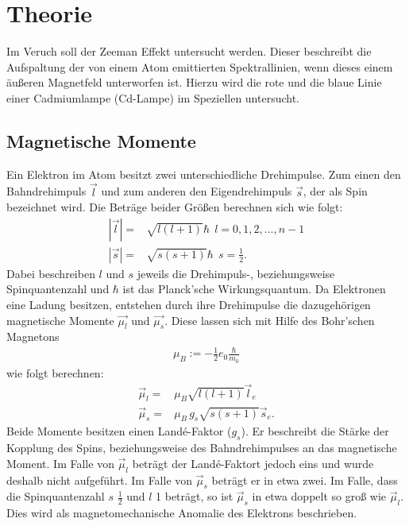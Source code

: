 \section{Theorie}
Im Veruch soll der Zeeman Effekt untersucht werden. Dieser beschreibt die Aufspaltung der
von einem Atom emittierten Spektrallinien, wenn dieses einem äußeren Magnetfeld unterworfen
ist. Hierzu wird die rote und die blaue Linie einer Cadmiumlampe (Cd-Lampe) im Speziellen
untersucht.
\subsection{Magnetische Momente}
Ein Elektron im Atom besitzt zwei unterschiedliche Drehimpulse. Zum einen den Bahndrehimpuls
$\vec{l}$ und zum anderen den Eigendrehimpuls $\vec{s}$, der als Spin bezeichnet wird.
Die Beträge beider Größen berechnen sich wie folgt:
\begin{align*}
    |\vec{l}| =& \sqrt{l(l+1)}\hbar \ \ l = {0, 1, 2, ..., n-1}\\
    |\vec{s}| =& \sqrt{s(s+1)}\hbar \ \ s = \frac{1}{2}.
\end{align*}
Dabei beschreiben $l$ und $s$ jeweils die Drehimpuls-, beziehungsweise Spinquantenzahl
und $\hbar$ ist das Planck'sche Wirkungsquantum.
Da Elektronen eine Ladung besitzen, entstehen durch ihre Drehimpulse die dazugehörigen
magnetische Momente $\vec{\mu_l}$ und $\vec{\mu_s}$.
Diese lassen sich mit Hilfe des Bohr'schen Magnetons
\FloatBarrier
\begin{align*}
    \mu_B := -\frac{1}{2}e_0\frac{\hbar}{m_0}
\end{align*}
wie folgt berechnen:
\begin{align*}
    \vec{\mu}_l =& \mu_B\sqrt{l(l+1)}\vec{l}_e\\
    \vec{\mu}_s =& \mu_B \, g_s \sqrt{s(s+1)} \vec{s}_e .
\end{align*}
Beide Momente besitzen einen Landé-Faktor ($g_s$). Er beschreibt die Stärke der Kopplung des
Spins, beziehungsweise des Bahndrehimpulses an das magnetische Moment. Im Falle von
$\vec{\mu}_l$ beträgt der Landé-Faktort jedoch eins und wurde deshalb nicht aufgeführt.
Im Falle von $\vec{\mu}_s$ beträgt er in etwa zwei.
Im Falle, dass die Spinquantenzahl $s$ $\frac{1}{2}$ und $l$ 1 beträgt, so ist
$\vec{\mu}_s$ in etwa doppelt so groß wie $\vec{\mu}_l$. Dies wird als magnetomechanische
Anomalie des Elektrons beschrieben.

